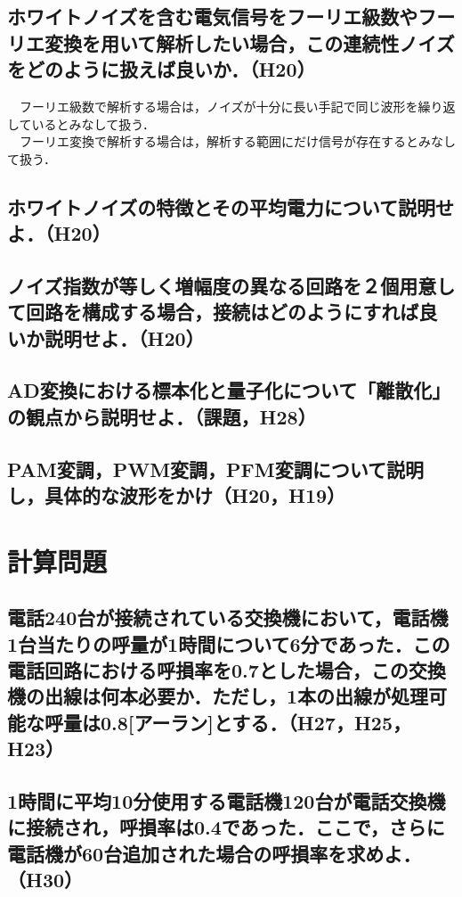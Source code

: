 \subsection{ホワイトノイズを含む電気信号をフーリエ級数やフーリエ変換を用いて解析したい場合，この連続性ノイズをどのように扱えば良いか．（H20）}
　フーリエ級数で解析する場合は，ノイズが十分に長い手記で同じ波形を繰り返しているとみなして扱う．\\
　フーリエ変換で解析する場合は，解析する範囲にだけ信号が存在するとみなして扱う．\\

\subsection{ホワイトノイズの特徴とその平均電力について説明せよ．（H20）}

\subsection{ノイズ指数が等しく増幅度の異なる回路を２個用意して回路を構成する場合，接続はどのようにすれば良いか説明せよ．（H20）}

\subsection{AD変換における標本化と量子化について「離散化」の観点から説明せよ．（課題，H28）}

\subsection{PAM変調，PWM変調，PFM変調について説明し，具体的な波形をかけ（H20，H19）}

\newpage
\section{計算問題}
\subsection{電話240台が接続されている交換機において，電話機1台当たりの呼量が1時間について6分であった．この電話回路における呼損率を0.7とした場合，この交換機の出線は何本必要か．ただし，1本の出線が処理可能な呼量は0.8[アーラン]とする．（H27，H25，H23）}
\vspace{7cm}

\subsection{1時間に平均10分使用する電話機120台が電話交換機に接続され，呼損率は0.4であった．ここで，さらに電話機が60台追加された場合の呼損率を求めよ．（H30）}
\vspace{7cm}

